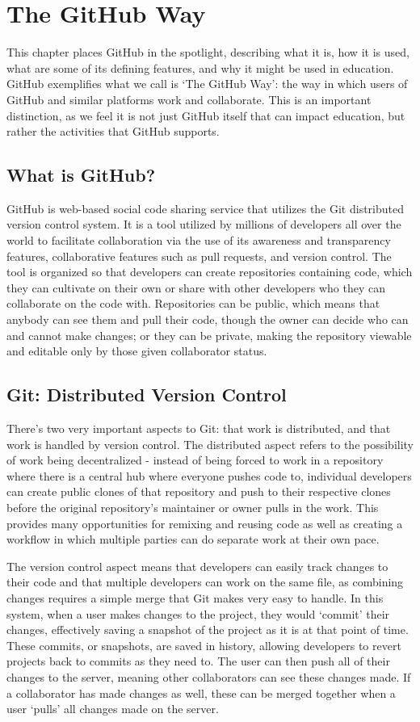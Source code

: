 \chapter{The GitHub Way}
This chapter places GitHub in the spotlight, describing what it is, how it is used, what are some of its defining features, and why it might be used in education. GitHub exemplifies what we call is `The GitHub Way': the way in which users of GitHub and similar platforms work and collaborate. This is an important distinction, as we feel it is not just GitHub itself that can impact education, but rather the activities that GitHub supports.

\section{What is GitHub?}
GitHub is web-based social code sharing service that utilizes the Git distributed version control system. It is a tool utilized by millions of developers all over the world to facilitate collaboration via the use of its awareness and transparency features, collaborative features such as pull requests, and version control. The tool is organized so that developers can create repositories containing code, which they can cultivate on their own or share with other developers who they can collaborate on the code with. Repositories can be public, which means that anybody can see them and pull their code, though the owner can decide who can and cannot make changes; or they can be private, making the repository viewable and editable only by those given collaborator status.

\section{Git: Distributed Version Control}
There's two very important aspects to Git: that work is distributed, and that work is handled by version control. The distributed aspect refers to the possibility of work being decentralized - instead of being forced to work in a repository where there is a central hub where everyone pushes code to, individual developers can create public clones of that repository and push to their respective clones before the original repository's maintainer or owner pulls in the work. This provides many opportunities for remixing and reusing code as well as creating a workflow in which multiple parties can do separate work at their own pace.

The version control aspect means that developers can easily track changes to their code and that multiple developers can work on the same file, as combining changes requires a simple merge that Git makes very easy to handle. In this system, when a user makes changes to the project, they would `commit' their changes, effectively saving a snapshot of the project as it is at that point of time. These commits, or snapshots, are saved in history, allowing developers to revert projects back to commits as they need to. The user can then push all of their changes to the server, meaning other collaborators can see these changes made. If a collaborator has made changes as well, these can be merged together when a user `pulls' all changes made on the server.

